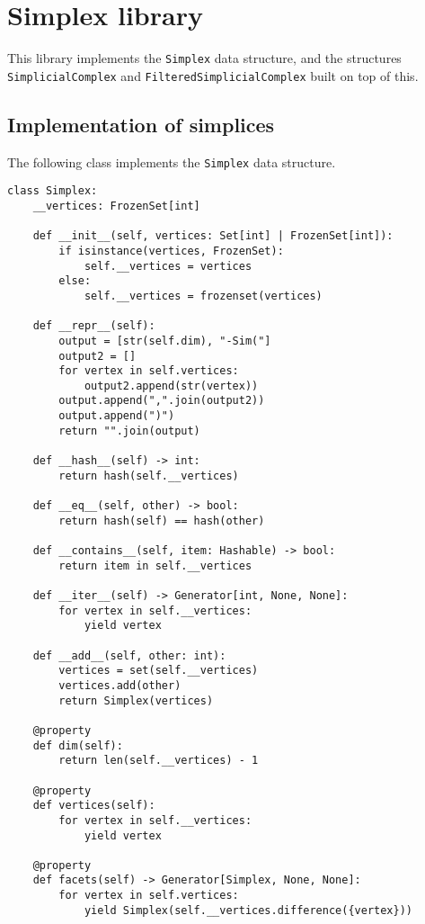 \section{Simplex library}

This library implements the \texttt{Simplex} data structure, and the structures \texttt{SimplicialComplex} and \texttt{FilteredSimplicialComplex} built on top of this.

\subsection{Implementation of simplices}

The following class implements the \texttt{Simplex} data structure.

\begin{verbatim}
class Simplex:
    __vertices: FrozenSet[int]

    def __init__(self, vertices: Set[int] | FrozenSet[int]):
        if isinstance(vertices, FrozenSet):
            self.__vertices = vertices
        else:
            self.__vertices = frozenset(vertices)

    def __repr__(self):
        output = [str(self.dim), "-Sim("]
        output2 = []
        for vertex in self.vertices:
            output2.append(str(vertex))
        output.append(",".join(output2))
        output.append(")")
        return "".join(output)

    def __hash__(self) -> int:
        return hash(self.__vertices)

    def __eq__(self, other) -> bool:
        return hash(self) == hash(other)

    def __contains__(self, item: Hashable) -> bool:
        return item in self.__vertices

    def __iter__(self) -> Generator[int, None, None]:
        for vertex in self.__vertices:
            yield vertex

    def __add__(self, other: int):
        vertices = set(self.__vertices)
        vertices.add(other)
        return Simplex(vertices)

    @property
    def dim(self):
        return len(self.__vertices) - 1

    @property
    def vertices(self):
        for vertex in self.__vertices:
            yield vertex

    @property
    def facets(self) -> Generator[Simplex, None, None]:
        for vertex in self.vertices:
            yield Simplex(self.__vertices.difference({vertex}))


\end{verbatim}
